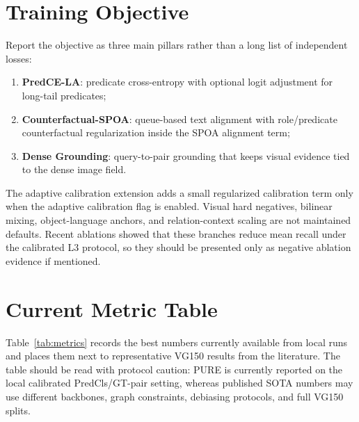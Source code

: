 \documentclass[11pt]{article}
\begin{document}
\section{Training Objective}
Report the objective as three main pillars rather than a long list of independent losses:
\begin{enumerate}[leftmargin=1.5em]
  \item \textbf{PredCE-LA}: predicate cross-entropy with optional logit adjustment for long-tail predicates;
  \item \textbf{Counterfactual-SPOA}: queue-based text alignment with role/predicate counterfactual regularization inside the SPOA alignment term;
  \item \textbf{Dense Grounding}: query-to-pair grounding that keeps visual evidence tied to the dense image field.
\end{enumerate}
The adaptive calibration extension adds a small regularized calibration term only when the adaptive calibration flag is enabled. Visual hard negatives, bilinear mixing, object-language anchors, and relation-context scaling are not maintained defaults. Recent ablations showed that these branches reduce mean recall under the calibrated L3 protocol, so they should be presented only as negative ablation evidence if mentioned.

\section{Current Metric Table}
Table~\ref{tab:metrics} records the best numbers currently available from local runs and places them next to representative VG150 results from the literature. The table should be read with protocol caution: PURE is currently reported on the local calibrated PredCls/GT-pair setting, whereas published SOTA numbers may use different backbones, graph constraints, debiasing protocols, and full VG150 splits.
\end{document}
